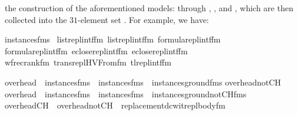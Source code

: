 the construction of the aforementioned models: 
through , , and
,
which are then collected into the $31$-element set .
For example, we have:%
\begin{isabelle}%
instances{}{\isacharunderscore}{\kern0pt}fms\ {\isasymequiv}\isanewline
{\isacharbraceleft}{\kern0pt}list{\isacharunderscore}{\kern0pt}repl{}{\isacharunderscore}{\kern0pt}intf{\isacharunderscore}{\kern0pt}fm{\isacharcomma}{\kern0pt}\ list{\isacharunderscore}{\kern0pt}repl{}{\isacharunderscore}{\kern0pt}intf{\isacharunderscore}{\kern0pt}fm{\isacharcomma}{\kern0pt}\ formula{\isacharunderscore}{\kern0pt}repl{}{\isacharunderscore}{\kern0pt}intf{\isacharunderscore}{\kern0pt}fm{\isacharcomma}{\kern0pt}\isanewline
\isaindent{{\isacharbraceleft}{\kern0pt}}formula{\isacharunderscore}{\kern0pt}repl{}{\isacharunderscore}{\kern0pt}intf{\isacharunderscore}{\kern0pt}fm{\isacharcomma}{\kern0pt}\ eclose{\isacharunderscore}{\kern0pt}repl{}{\isacharunderscore}{\kern0pt}intf{\isacharunderscore}{\kern0pt}fm{\isacharcomma}{\kern0pt}\ eclose{\isacharunderscore}{\kern0pt}repl{}{\isacharunderscore}{\kern0pt}intf{\isacharunderscore}{\kern0pt}fm{\isacharcomma}{\kern0pt}\isanewline
\isaindent{{\isacharbraceleft}{\kern0pt}}wfrec{\isacharunderscore}{\kern0pt}rank{\isacharunderscore}{\kern0pt}fm{\isacharcomma}{\kern0pt}\ trans{\isacharunderscore}{\kern0pt}repl{\isacharunderscore}{\kern0pt}HVFrom{\isacharunderscore}{\kern0pt}fm{\isacharcomma}{\kern0pt}\ tl{\isacharunderscore}{\kern0pt}repl{\isacharunderscore}{\kern0pt}intf{\isacharunderscore}{\kern0pt}fm{\isacharbraceright}{\kern0pt}%
\end{isabelle}%
\begin{isabelle}%
overhead\ {\isasymequiv}\ instances{}{\isacharunderscore}{\kern0pt}fms\ {\isasymunion}\ instances{}{\isacharunderscore}{\kern0pt}fms\ {\isasymunion}\ instances{\isacharunderscore}{\kern0pt}ground{\isacharunderscore}{\kern0pt}fms\isasep\isanewline\isanewline%
overhead{\isacharunderscore}{\kern0pt}notCH\ {\isasymequiv}\isanewline
overhead\ {\isasymunion}\ instances{}{\isacharunderscore}{\kern0pt}fms\ {\isasymunion}\ instances{}{\isacharunderscore}{\kern0pt}fms\ {\isasymunion}\ instances{\isacharunderscore}{\kern0pt}ground{\isacharunderscore}{\kern0pt}notCH{\isacharunderscore}{\kern0pt}fms\isasep\isanewline\isanewline%
overhead{\isacharunderscore}{\kern0pt}CH\ {\isasymequiv}\ overhead{\isacharunderscore}{\kern0pt}notCH\ {\isasymunion}\ {\isacharbraceleft}{\kern0pt}replacement{\isacharunderscore}{\kern0pt}dcwit{\isacharunderscore}{\kern0pt}repl{\isacharunderscore}{\kern0pt}body{\isacharunderscore}{\kern0pt}fm{\isacharbraceright}{\kern0pt}%
\end{isabelle}%
